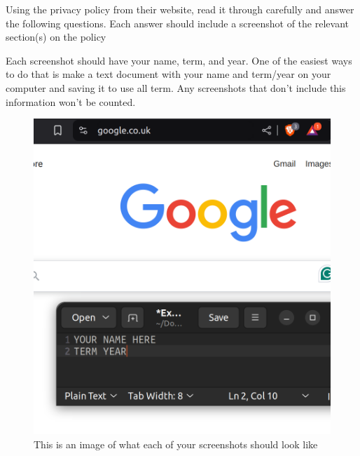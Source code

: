 \documentclass[12pt]{article}
\begin{document}
        

Using the privacy policy from their website, read it through carefully and answer the following questions.  Each answer should include a screenshot of the relevant section(s) on the policy

Each screenshot should have your name, term, and year.  One of the easiest ways to do that is make a text document with your name and term/year on your computer and saving it to use all term. Any screenshots that don't include this information won't be counted.

\begin{figure}[h!]
    \centerline{\includegraphics[scale=.2]{ExampleScreenshot.png}}
    \caption{This is an image of what each of your screenshots should look like}

    \end{figure} 
\end{document}
